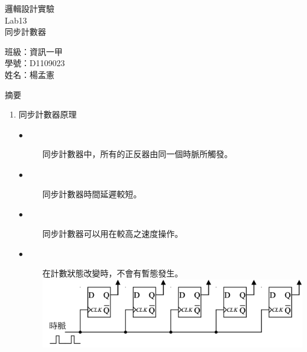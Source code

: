 \documentclass[12pt, a4paper]{article}
\begin{document}
\begin{center}
  {\Huge 邏輯設計實驗} \\[2.5cm]
  {\Huge Lab13} \\[1.5cm]
  {\Huge 同步計數器} \\ [4.5cm]
  \hspace{.6in}
  \begin{minipage}[t]{.4\linewidth}
    {\Large 班級：資訊一甲}\\[0.5cm]
    {\Large 學號：D1109023}\\[0.5cm]
    {\Large 姓名：楊孟憲}
  \end{minipage}    
\end{center}

\newpage

\begin{description}
  \fontsize{22pt}{25pt}\selectfont 
    \item [一、]摘要 
      \begin{enumerate}
        \fontsize{20pt}{22pt}\selectfont
          \item 同步計數器原理 \\
            \begin{samepage}
              \fontsize{16pt}{20}\selectfont
              \begin{description}
                \item [$\bullet$] 同步計數器中，所有的正反器由同一個時脈所觸發。
                \item [$\bullet$] 同步計數器時間延遲較短。
                \item [$\bullet$] 同步計數器可以用在較高之速度操作。
                \item [$\bullet$] 在計數狀態改變時，不會有暫態發生。 \\[.2cm]
                \includegraphics[width=13cm]{./image/jk_flip_flop.png}
              \end{description}
            \end{samepage}


\end{enumerate}
\end{description}
\end{document}
